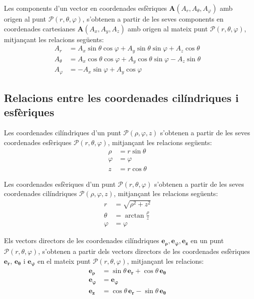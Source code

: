 \documentclass[catalan,a4paper,twoside,11pt]{article}
\begin{document}
Les components d'un vector en coordenades esfèriques $\boldsymbol{A}(A_r, A_\theta, A_\varphi)$ amb origen al punt $\mathscr{P}(r,\theta,\varphi)$, s'obtenen a partir de les seves components en coordenades cartesianes $\boldsymbol{A}(A_x, A_y, A_z)$ amb origen al mateix punt $\mathscr{P}(r,\theta,\varphi)$, mitjançant les relacions següents:
\begin{subequations}\begin{align}
    A_r &=  A_x\sin\theta\cos\varphi+A_y\sin\theta\sin\varphi+A_z\cos\theta\\
    A_\theta &=  A_x\cos\theta\cos\varphi+A_y\cos\theta\sin\varphi-A_z\sin\theta\\
    A_\varphi &= -A_x\sin\varphi+A_y\cos\varphi
\end{align}\end{subequations}


\subsection{Relacions entre les coordenades cilíndriques i
esfèriques}

Les coordenades cilíndriques  d'un punt $\mathscr{P}(\rho,\varphi,z)$
s'obtenen a partir de les seves coordenades esfèriques
$\mathscr{P}(r,\theta,\varphi)$, mitjançant les relacions següents:
\begin{subequations}\begin{align}
    \rho &=r\sin\theta \\ \varphi &=\varphi \\z &=r\cos\theta
\end{align}\end{subequations}

Les coordenades  esfèriques  d'un punt $\mathscr{P}(r,\theta,\varphi)$
s'obtenen a partir de les seves coordenades cilíndriques
$\mathscr{P}(\rho,\varphi,z)$, mitjançant les relacions següents:
\begin{subequations}\begin{align}
    r &=\sqrt{\rho^2+z^2}\\
    \theta &=\arctan\frac{\rho}{z}\\
    \varphi &=\varphi
\end{align}\end{subequations}

Els vectors directors de les coordenades cilíndriques $\boldsymbol{e_\rho},\boldsymbol{e_\varphi},\boldsymbol{e_z}$  en un punt $\mathscr{P}(r,\theta,\varphi)$, s'obtenen a partir dels vectors directors de les coordenades esfèriques $\boldsymbol{e_r}$, $\boldsymbol{e_\theta}$ i $\boldsymbol{e_\varphi}$ en el mateix punt $\mathscr{P}(r,\theta,\varphi)$,
mitjançant les relacions:
\begin{subequations}\begin{align}
		\boldsymbol{e_\rho} &=\sin\theta\,\boldsymbol{e_r}+
		\cos\theta\,\boldsymbol{e_\theta}\\
		\boldsymbol{e_\varphi}&=\boldsymbol{e_\varphi}\\
		\boldsymbol{e_z} &=\cos\theta\,\boldsymbol{e_r}-
		\sin\theta\,\boldsymbol{e_\theta}
\end{align}\end{subequations}
\end{document}

